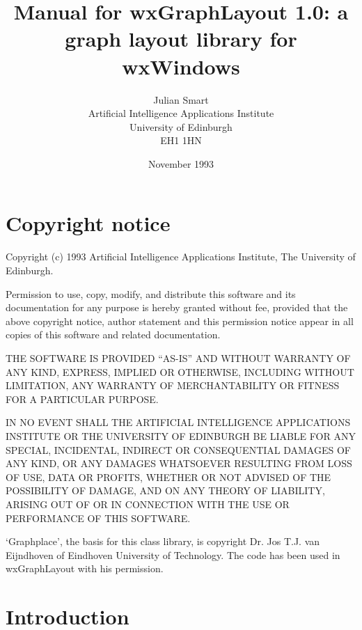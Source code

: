 %

\parskip=10pt%
\title{Manual for wxGraphLayout 1.0: a graph layout library for wxWindows}
\author{Julian Smart\\Artificial Intelligence Applications Institute\\
University of Edinburgh\\EH1 1HN}
\date{November 1993}%
\makeindex%
%
\maketitle
%
\pagestyle{fancyplain}

\setfooter{\thepage}{}{}{}{}{\thepage}
\tableofcontents%

\chapter*{Copyright notice}
%
\setfooter{\thepage}{}{}{}{}{\thepage}

Copyright (c) 1993 Artificial Intelligence Applications Institute,
The University of Edinburgh.

Permission to use, copy, modify, and distribute this software and its
documentation for any purpose is hereby granted without fee, provided that the
above copyright notice, author statement and this permission notice appear in
all copies of this software and related documentation.

THE SOFTWARE IS PROVIDED ``AS-IS'' AND WITHOUT WARRANTY OF ANY KIND, EXPRESS,
IMPLIED OR OTHERWISE, INCLUDING WITHOUT LIMITATION, ANY WARRANTY OF
MERCHANTABILITY OR FITNESS FOR A PARTICULAR PURPOSE.

IN NO EVENT SHALL THE ARTIFICIAL INTELLIGENCE APPLICATIONS INSTITUTE OR THE
UNIVERSITY OF EDINBURGH BE LIABLE FOR ANY SPECIAL, INCIDENTAL, INDIRECT OR
CONSEQUENTIAL DAMAGES OF ANY KIND, OR ANY DAMAGES WHATSOEVER RESULTING FROM
LOSS OF USE, DATA OR PROFITS, WHETHER OR NOT ADVISED OF THE POSSIBILITY OF
DAMAGE, AND ON ANY THEORY OF LIABILITY, ARISING OUT OF OR IN CONNECTION WITH
THE USE OR PERFORMANCE OF THIS SOFTWARE.

`Graphplace', the basis for this class library, is copyright Dr. Jos
T.J. van Eijndhoven of Eindhoven University of Technology. The code has
been used in wxGraphLayout with his permission.

\chapter{Introduction}
%
%
\setfooter{\thepage}{}{}{}{}{\thepage}

